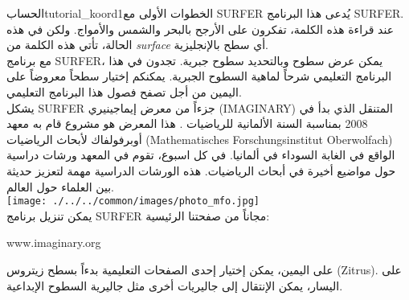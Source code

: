 \begin{surferIntroPage}{الحساب}{tutorial_koord1}{الخطوات الأولى مع SURFER}
يُدعى هذا البرنامج \textenglish{SURFER}. عند قراءة هذه الكلمة، تفكرون على الأرجح بالبحر والشمس والأمواج. ولكن في هذه الحالة، تأتي هذه الكلمة من \textenglish{\it surface} أي سطح بالإنجليزية.
\\
مع برنامج \textenglish{SURFER}، يمكن عرض سطوح وبالتحديد سطوح جبرية. تجدون في هذا البرنامج التعليمي شرحاً لماهية السطوح الجبرية. يمكنكم إختيار سطحاً معروضاً على اليمين من أجل تصفح فصول هذا البرنامج التعليمي.\\
يشكل \textenglish{SURFER} جزءاً من معرض إيماجينيري
 \textenglish{(IMAGINARY)}
  المتنقل الذي بدأ في 2008 بمناسبة السنة الألمانية للرياضيات . هذا المعرض هو مشروع قام به معهد أوبرفولفاك لأبحاث الرياضيات
\textenglish{(Mathematisches Forschungsinstitut Oberwolfach)}
 الواقع في الغابة السوداء في ألمانيا. في كل اسبوع، تقوم في المعهد ورشات دراسية حول مواضيع أخيرة في أبحاث الرياضيات. هذه الورشات الدراسية مهمة لتعزيز حديثة بين العلماء حول العالم. \\
\vspace{0.2cm} \hspace{3.5cm}\texttt{[image: ./../../common/images/photo\_mfo.jpg]}\\
يمكن تنزيل برنامج \textenglish{SURFER} مجاناً من صفحتنا الرئيسية: \\
\begin{centering}
\textenglish{www.imaginary.org}\\
\end{centering}
 \vspace{0.2cm}
على اليمين، يمكن إختيار إحدى الصفحات التعليمية بدءاً بسطح زيتروس
 \textenglish{(Zitrus)}.
  على اليسار، يمكن الإنتقال إلى جاليريات أخرى مثل جاليرية السطوح الإبداعية.
\end{surferIntroPage}
